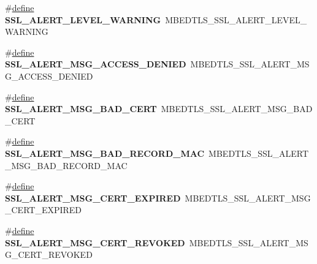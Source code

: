 \begin{DoxyCompactItemize}
\item 
\mbox{\label{compat-1_83_8h_a3f8f7ea03f02f45a427379d17c0c3381}} 
\#\hyperlink{structdefine}{define} {\bfseries S\+S\+L\+\_\+\+A\+L\+E\+R\+T\+\_\+\+L\+E\+V\+E\+L\+\_\+\+W\+A\+R\+N\+I\+NG}~M\+B\+E\+D\+T\+L\+S\+\_\+\+S\+S\+L\+\_\+\+A\+L\+E\+R\+T\+\_\+\+L\+E\+V\+E\+L\+\_\+\+W\+A\+R\+N\+I\+NG
\item 
\mbox{\label{compat-1_83_8h_a00a2f8661c31e2e1211e0586398d3f3d}} 
\#\hyperlink{structdefine}{define} {\bfseries S\+S\+L\+\_\+\+A\+L\+E\+R\+T\+\_\+\+M\+S\+G\+\_\+\+A\+C\+C\+E\+S\+S\+\_\+\+D\+E\+N\+I\+ED}~M\+B\+E\+D\+T\+L\+S\+\_\+\+S\+S\+L\+\_\+\+A\+L\+E\+R\+T\+\_\+\+M\+S\+G\+\_\+\+A\+C\+C\+E\+S\+S\+\_\+\+D\+E\+N\+I\+ED
\item 
\mbox{\label{compat-1_83_8h_ab0fc5a1e3b26c77591deb67d4c0265b7}} 
\#\hyperlink{structdefine}{define} {\bfseries S\+S\+L\+\_\+\+A\+L\+E\+R\+T\+\_\+\+M\+S\+G\+\_\+\+B\+A\+D\+\_\+\+C\+E\+RT}~M\+B\+E\+D\+T\+L\+S\+\_\+\+S\+S\+L\+\_\+\+A\+L\+E\+R\+T\+\_\+\+M\+S\+G\+\_\+\+B\+A\+D\+\_\+\+C\+E\+RT
\item 
\mbox{\label{compat-1_83_8h_a736fe8af8eab0091654f5ee538f54822}} 
\#\hyperlink{structdefine}{define} {\bfseries S\+S\+L\+\_\+\+A\+L\+E\+R\+T\+\_\+\+M\+S\+G\+\_\+\+B\+A\+D\+\_\+\+R\+E\+C\+O\+R\+D\+\_\+\+M\+AC}~M\+B\+E\+D\+T\+L\+S\+\_\+\+S\+S\+L\+\_\+\+A\+L\+E\+R\+T\+\_\+\+M\+S\+G\+\_\+\+B\+A\+D\+\_\+\+R\+E\+C\+O\+R\+D\+\_\+\+M\+AC
\item 
\mbox{\label{compat-1_83_8h_a08cedd5d2c7b75509aec63668f02dfcd}} 
\#\hyperlink{structdefine}{define} {\bfseries S\+S\+L\+\_\+\+A\+L\+E\+R\+T\+\_\+\+M\+S\+G\+\_\+\+C\+E\+R\+T\+\_\+\+E\+X\+P\+I\+R\+ED}~M\+B\+E\+D\+T\+L\+S\+\_\+\+S\+S\+L\+\_\+\+A\+L\+E\+R\+T\+\_\+\+M\+S\+G\+\_\+\+C\+E\+R\+T\+\_\+\+E\+X\+P\+I\+R\+ED
\item 
\mbox{\label{compat-1_83_8h_aa39fba2c4ce5ed5eef811bbcd331df20}} 
\#\hyperlink{structdefine}{define} {\bfseries S\+S\+L\+\_\+\+A\+L\+E\+R\+T\+\_\+\+M\+S\+G\+\_\+\+C\+E\+R\+T\+\_\+\+R\+E\+V\+O\+K\+ED}~M\+B\+E\+D\+T\+L\+S\+\_\+\+S\+S\+L\+\_\+\+A\+L\+E\+R\+T\+\_\+\+M\+S\+G\+\_\+\+C\+E\+R\+T\+\_\+\+R\+E\+V\+O\+K\+ED
\item 
\mbox{\label{compat-1_83_8h_a1190be949de654aa59926a1a47722ef0}} 

\end{DoxyCompactItemize}
